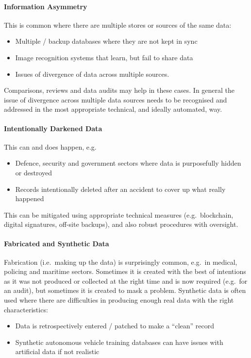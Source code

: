 \paragraph{Information Asymmetry}\label{bkm:dark12}
This is common where there are multiple stores or sources of the same data:
\begin{itemize}
\item Multiple / backup databases where they are not kept in sync
  \item Image recognition systems that learn, but fail to share data
  \item Issues of divergence of data across multiple sources.
\end{itemize}

Comparisons, reviews and data audits may help in these cases. In general the issue of divergence across multiple data sources needs to be recognised and addressed in the most appropriate technical, and ideally automated, way.

\paragraph{Intentionally Darkened Data}\label{bkm:dark13}
This can and does happen, e.g.
\begin{itemize}
\item Defence, security and government sectors where data is purposefully hidden or destroyed
  \item Records intentionally deleted after an accident to cover up what really happened
\end{itemize}

This can be mitigated using appropriate technical measures (e.g.\ blockchain, digital signatures, off-site backups), and also robust procedures with oversight.

\paragraph{Fabricated and Synthetic Data}\label{bkm:dark14}
Fabrication (i.e.\ making up the data) is surprisingly common, e.g.\ in medical, policing and maritime sectors. Sometimes it is created with the best of intentions as it was not produced or collected at the right time and is now required (e.g.\ for an audit), but sometimes it is created to mask a problem. Synthetic data is often used where there are difficulties in producing enough real data with the right characteristics:
\begin{itemize}
\item Data is retrospectively entered / patched to make a “clean” record
  \item Synthetic autonomous vehicle training databases can have issues with artificial data if not realistic
\end{itemize}

